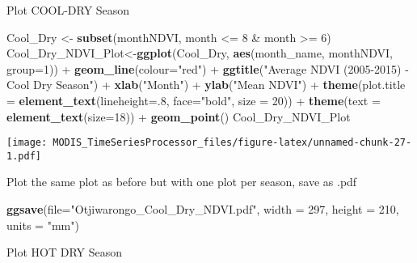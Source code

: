 \documentclass[]{article}
\newenvironment{Shaded}{\begin{snugshade}}{\end{snugshade}}
\newcommand{\KeywordTok}[1]{\textcolor[rgb]{0.13,0.29,0.53}{\textbf{{#1}}}}
\newcommand{\DataTypeTok}[1]{\textcolor[rgb]{0.13,0.29,0.53}{{#1}}}
\newcommand{\DecValTok}[1]{\textcolor[rgb]{0.00,0.00,0.81}{{#1}}}
\newcommand{\StringTok}[1]{\textcolor[rgb]{0.31,0.60,0.02}{{#1}}}
\newcommand{\NormalTok}[1]{{#1}}
\begin{document}
Plot COOL-DRY Season

\begin{Shaded}
\begin{Highlighting}[]
\NormalTok{Cool_Dry <-}\StringTok{ }\KeywordTok{subset}\NormalTok{(monthNDVI, month <=}\StringTok{ }\DecValTok{8} \NormalTok{&}\StringTok{ }\NormalTok{month >=}\StringTok{ }\DecValTok{6}\NormalTok{)}
\NormalTok{Cool_Dry_NDVI_Plot<-}\KeywordTok{ggplot}\NormalTok{(Cool_Dry, }\KeywordTok{aes}\NormalTok{(month_name, monthNDVI, }\DataTypeTok{group=}\DecValTok{1}\NormalTok{)) +}
\StringTok{  }\KeywordTok{geom_line}\NormalTok{(}\DataTypeTok{colour=}\StringTok{"red"}\NormalTok{) +}
\StringTok{  }\KeywordTok{ggtitle}\NormalTok{(}\StringTok{"Average NDVI (2005-2015) - Cool Dry Season"}\NormalTok{) +}
\StringTok{  }\KeywordTok{xlab}\NormalTok{(}\StringTok{"Month"}\NormalTok{) +}\StringTok{ }\KeywordTok{ylab}\NormalTok{(}\StringTok{"Mean NDVI"}\NormalTok{) +}
\StringTok{  }\KeywordTok{theme}\NormalTok{(}\DataTypeTok{plot.title =} \KeywordTok{element_text}\NormalTok{(}\DataTypeTok{lineheight=}\NormalTok{.}\DecValTok{8}\NormalTok{, }\DataTypeTok{face=}\StringTok{"bold"}\NormalTok{,}
                                  \DataTypeTok{size =} \DecValTok{20}\NormalTok{)) +}
\StringTok{  }\KeywordTok{theme}\NormalTok{(}\DataTypeTok{text =} \KeywordTok{element_text}\NormalTok{(}\DataTypeTok{size=}\DecValTok{18}\NormalTok{)) +}\StringTok{ }\KeywordTok{geom_point}\NormalTok{()}
\NormalTok{Cool_Dry_NDVI_Plot}
\end{Highlighting}
\end{Shaded}

\texttt{[image: MODIS\_TimeSeriesProcessor\_files/figure-latex/unnamed-chunk-27-1.pdf]}

Plot the same plot as before but with one plot per season, save as .pdf

\begin{Shaded}
\begin{Highlighting}[]
\KeywordTok{ggsave}\NormalTok{(}\DataTypeTok{file=}\StringTok{"Otjiwarongo_Cool_Dry_NDVI.pdf"}\NormalTok{, }\DataTypeTok{width =} \DecValTok{297}\NormalTok{, }\DataTypeTok{height =} \DecValTok{210}\NormalTok{, }\DataTypeTok{units =} 
         \StringTok{"mm"}\NormalTok{)}
\end{Highlighting}
\end{Shaded}

Plot HOT DRY Season
\end{document}
